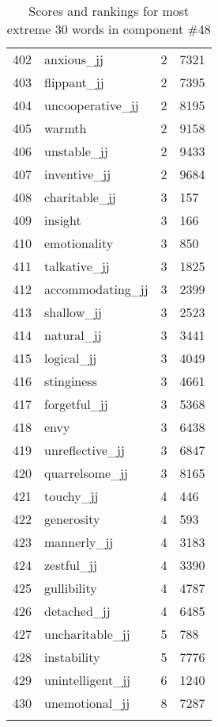 \begin{longtable}[!htbp]{| rlr@{.}l |}
    402 & anxious\_jj & 2 & 7321 \\
    403 & flippant\_jj & 2 & 7395 \\
    404 & uncooperative\_jj & 2 & 8195 \\
    405 & warmth & 2 & 9158 \\
    406 & unstable\_jj & 2 & 9433 \\
    407 & inventive\_jj & 2 & 9684 \\
    408 & charitable\_jj & 3 & 157 \\
    409 & insight & 3 & 166 \\
    410 & emotionality & 3 & 850 \\
    411 & talkative\_jj & 3 & 1825 \\
    412 & accommodating\_jj & 3 & 2399 \\
    413 & shallow\_jj & 3 & 2523 \\
    414 & natural\_jj & 3 & 3441 \\
    415 & logical\_jj & 3 & 4049 \\
    416 & stinginess & 3 & 4661 \\
    417 & forgetful\_jj & 3 & 5368 \\
    418 & envy & 3 & 6438 \\
    419 & unreflective\_jj & 3 & 6847 \\
    420 & quarrelsome\_jj & 3 & 8165 \\
    421 & touchy\_jj & 4 & 446 \\
    422 & generosity & 4 & 593 \\
    423 & mannerly\_jj & 4 & 3183 \\
    424 & zestful\_jj & 4 & 3390 \\
    425 & gullibility & 4 & 4787 \\
    426 & detached\_jj & 4 & 6485 \\
    427 & uncharitable\_jj & 5 & 788 \\
    428 & instability & 5 & 7776 \\
    429 & unintelligent\_jj & 6 & 1240 \\
    430 & unemotional\_jj & 8 & 7287 \\
    \hline
    \caption{Scores and rankings for most extreme 30 words in component \#48} \\
\end{longtable}

